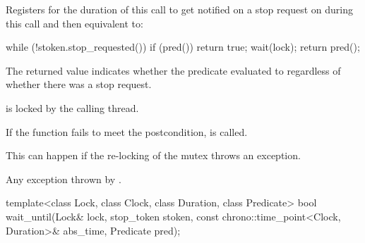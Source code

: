 \begin{itemdescr}
\pnum
\effects
Registers for the duration of this call 
to get notified on a stop request on 
during this call and then equivalent to:
\begin{codeblock}
while (!stoken.stop_requested()) {
  if (pred())
    return true;
  wait(lock);
}
return pred();
\end{codeblock}

\pnum
\begin{note}
The returned value indicates whether the predicate evaluated to
 regardless of whether there was a stop request.
\end{note}

\pnum
\ensures
{} is locked by the calling thread.

\pnum
\remarks
If the function fails to meet the postcondition,
 is called.
\begin{note}
This can happen if the re-locking of the mutex throws an exception.
\end{note}

\pnum
\throws
Any exception thrown by .
\end{itemdescr}

\begin{itemdecl}
template<class Lock, class Clock, class Duration, class Predicate>
  bool wait_until(Lock& lock, stop_token stoken,
                  const chrono::time_point<Clock, Duration>& abs_time, Predicate pred);
\end{itemdecl}

